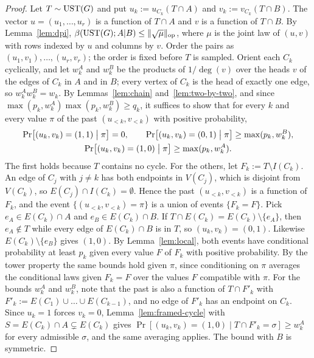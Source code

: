 \begin{proof}
Let $T\sim\mathrm{UST}(G)$ and put $u_k:=u_{C_k}(T\cap A)$ and $v_k:=v_{C_k}(T\cap B)$. The vector $u=(u_1,\dots,u_r)$ is a function of $T\cap A$ and $v$ is a function of $T\cap B$. By Lemma~\ref{lem:dpi}, $\beta(\mathrm{UST}(G);A|B)\le\lVert \sqrt\mu\rVert_{\mathrm{op}}$, where $\mu$ is the joint law of $(u,v)$ with rows indexed by $u$ and columns by $v$. Order the pairs as $(u_1,v_1),\dots,(u_r,v_r)$; the order is fixed before $T$ is sampled. Orient each $C_k$ cyclically, and let $w_k^A$ and $w_k^B$ be the products of $1/\deg(v)$ over the heads $v$ of the edges of $C_k$ in $A$ and in $B$; every vertex of $C_k$ is the head of exactly one edge, so $w_k^Aw_k^B=w_k$. By Lemmas~\ref{lem:chain} and~\ref{lem:two-by-two}, and since $\max(p_k,w_k^A)\max(p_k,w_k^B)\ge q_k$, it suffices to show that for every $k$ and every value $\pi$ of the past $(u_{<k},v_{<k})$ with positive probability,
\begin{gather*}
  \Pr\bigl[(u_k,v_k)=(1,1)\bigm|\pi\bigr]=0,\qquad\Pr\bigl[(u_k,v_k)=(0,1)\bigm|\pi\bigr]\ge\max(p_k,w_k^B),\\
  \Pr\bigl[(u_k,v_k)=(1,0)\bigm|\pi\bigr]\ge\max(p_k,w_k^A) .
\end{gather*}
The first holds because $T$ contains no cycle. For the others, let $F_k:=T\setminus I(C_k)$. An edge of $C_j$ with $j\ne k$ has both endpoints in $V(C_j)$, which is disjoint from $V(C_k)$, so $E(C_j)\cap I(C_k)=\emptyset$. Hence the past $(u_{<k},v_{<k})$ is a function of $F_k$, and the event $\{(u_{<k},v_{<k})=\pi\}$ is a union of events $\{F_k=F\}$. Pick $e_A\in E(C_k)\cap A$ and $e_B\in E(C_k)\cap B$. If $T\cap E(C_k)=E(C_k)\setminus\{e_A\}$, then $e_A\notin T$ while every edge of $E(C_k)\cap B$ is in $T$, so $(u_k,v_k)=(0,1)$. Likewise $E(C_k)\setminus\{e_B\}$ gives $(1,0)$. By Lemma~\ref{lem:local}, both events have conditional probability at least $p_k$ given every value $F$ of $F_k$ with positive probability. By the tower property the same bounds hold given $\pi$, since conditioning on $\pi$ averages the conditional laws given $F_k=F$ over the values $F$ compatible with $\pi$. For the bounds $w_k^A$ and $w_k^B$, note that the past is also a function of $T\cap F'_k$ with $F'_k:=E(C_1)\cup\dots\cup E(C_{k-1})$, and no edge of $F'_k$ has an endpoint on $C_k$. Since $u_k=1$ forces $v_k=0$, Lemma~\ref{lem:framed-cycle} with $S=E(C_k)\cap A\subsetneq E(C_k)$ gives $\Pr[(u_k,v_k)=(1,0)\mid T\cap F'_k=\sigma]\ge w_k^A$ for every admissible $\sigma$, and the same averaging applies. The bound with $B$ is symmetric.
\end{proof}

